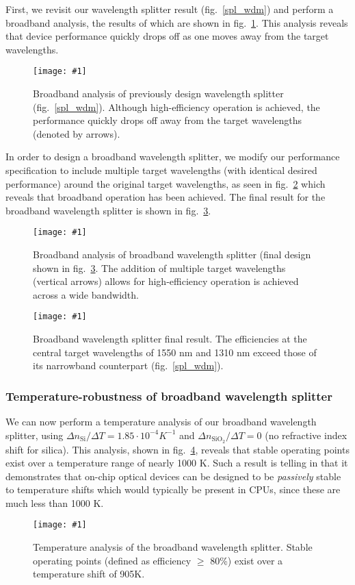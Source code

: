 \documentclass[letterpaper,10pt]{article}
\newcommand{\myfig}[2]{
    \begin{figure}[!h]
    \begin{centering}
    \texttt{[image: \#1]}
    \caption{#2}\label{#1}
    \end{centering}
    \end{figure}
}
\newcommand{\fig}[1]{fig.~\ref{#1}}
\begin{document}
First, we revisit our wavelength splitter result (\fig{spl_wdm})
    and perform a broadband analysis, 
    the results of which are shown in \fig{analysis_spl_only}.
This analysis reveals that device performance quickly drops off
    as one moves away from the target wavelengths.
\myfig{analysis_spl_only}
    {Broadband analysis of previously design wavelength splitter (\fig{spl_wdm}).
    Although high-efficiency operation is achieved, 
    the performance quickly drops off away from the target wavelengths 
    (denoted by arrows).}

In order to design a broadband wavelength splitter,
    we modify our performance specification to include multiple target 
    wavelengths (with identical desired performance) around the 
    original target wavelengths, as seen in \fig{analysis_top}
    which reveals that broadband operation has been achieved.
The final result for the broadband wavelength splitter is shown in \fig{top_wdm}.
\myfig{analysis_top}
    {Broadband analysis of broadband wavelength splitter 
        (final design shown in \fig{top_wdm}.
    The addition of multiple target wavelengths (vertical arrows)
    allows for 
    high-efficiency operation is achieved across a wide bandwidth.}
\myfig{top_wdm}
    {Broadband wavelength splitter final result.
    The efficiencies at the central target wavelengths of 1550 nm and 1310 nm
    exceed those of its narrowband counterpart (\fig{spl_wdm}).}

\subsubsection{Temperature-robustness of broadband wavelength splitter}
We can now perform a temperature analysis of our broadband wavelength splitter,
    using $\Delta n_\text{Si} / \Delta T = 1.85 \cdot 10^{-4} K^{-1}$ 
    and $\Delta n_{\text{SiO}_2} / \Delta T = 0$ 
    (no refractive index shift for silica).
This analysis, shown in \fig{analysis_temp_shift2},
    reveals that stable operating points exist
    over a temperature range of nearly 1000 K.
Such a result is telling in that it demonstrates
    that on-chip optical devices can be designed to be \emph{passively} stable
    to temperature shifts which would typically be present in CPUs,
    since these are much less than 1000 K.
\myfig{analysis_temp_shift2}
    {Temperature analysis of the broadband wavelength splitter.
    Stable operating points (defined as efficiency $\ge$ 80\%)
    exist over a temperature shift of 905K.}
\end{document}
